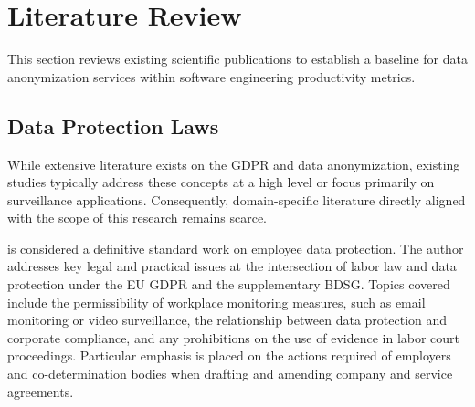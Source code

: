 \chapter{Literature Review}
\label{chapter:literature_review}

This section reviews existing scientific publications to establish a baseline for data anonymization services within software engineering productivity metrics.

\section{Data Protection Laws}
\label{sec:data_protection_laws}

While extensive literature exists on the \ac{GDPR} and data anonymization, existing studies typically address these concepts at a high level or focus primarily on surveillance applications. Consequently, domain-specific literature directly aligned with the scope of this research remains scarce.

\textcite{daeubler2017glaeserne} is considered a definitive standard work on employee data protection. The author addresses key legal and practical issues at the intersection of labor law and data protection under the EU \ac{GDPR} and the supplementary \ac{BDSG}. Topics covered include the permissibility of workplace monitoring measures, such as email monitoring or video surveillance, the relationship between data protection and corporate compliance, and any prohibitions on the use of evidence in labor court proceedings. Particular emphasis is placed on the actions required of employers and co-determination bodies when drafting and amending company and service agreements.

